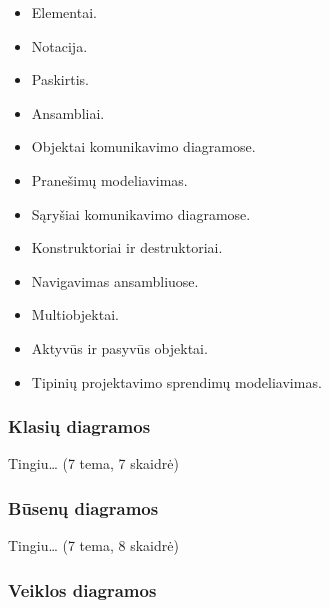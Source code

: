 \begin{itemize}
  \item Elementai.
  \item Notacija.
  \item Paskirtis.
  \item Ansambliai.
  \item Objektai komunikavimo diagramose.
  \item Pranešimų modeliavimas.
  \item Sąryšiai komunikavimo diagramose.
  \item Konstruktoriai ir destruktoriai.
  \item Navigavimas ansambliuose.
  \item Multiobjektai.
  \item Aktyvūs ir pasyvūs objektai.
  \item Tipinių projektavimo sprendimų modeliavimas.
\end{itemize}

\subsubsection{Klasių diagramos}

Tingiu… (7 tema, 7 skaidrė)

\subsubsection{Būsenų diagramos}

Tingiu… (7 tema, 8 skaidrė)

\subsubsection{Veiklos diagramos}

